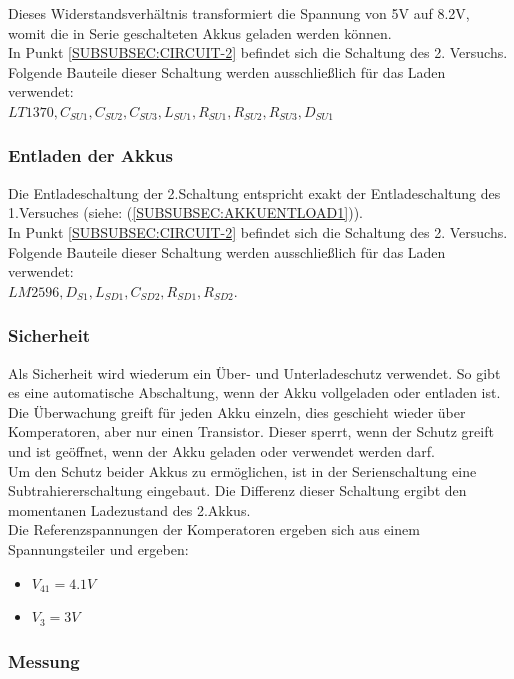 \documentclass[12pt,a4paper]{article}
\begin{document}
{\vspace{1cm}
Dieses Widerstandsverhältnis transformiert die Spannung von 5V auf 8.2V, womit die in Serie geschalteten Akkus geladen werden können.  \\
In Punkt \ref{SUBSUBSEC:CIRCUIT-2} befindet sich die Schaltung des 2. Versuchs. Folgende Bauteile dieser Schaltung werden ausschließlich für das Laden verwendet:\\ $LT1370,C_{SU1},C_{SU2},C_{SU3}, L_{SU1},R_{SU1},R_{SU2},R_{SU3},D_{SU1}$ 

\subsubsection{Entladen der Akkus}
\label{SUBSUBSEC:AKKUENTLOAD2}

Die Entladeschaltung der 2.Schaltung entspricht exakt der Entladeschaltung des 1.Versuches (siehe:  (\ref{SUBSUBSEC:AKKUENTLOAD1})).\\
In Punkt \ref{SUBSUBSEC:CIRCUIT-2} befindet sich die Schaltung des 2. Versuchs. Folgende Bauteile dieser Schaltung werden ausschließlich für das Laden verwendet:\\ $LM2596,D_{S1},L_{SD1},C_{SD2},R_{SD1},R_{SD2}$. 
\newpage

\subsubsection{Sicherheit}
\label{SUBSUBSEC:Security2}

Als Sicherheit wird wiederum ein Über- und Unterladeschutz verwendet. So gibt es eine automatische Abschaltung, wenn der Akku vollgeladen oder entladen ist. Die Überwachung greift für jeden Akku einzeln, dies geschieht wieder über Komperatoren, aber nur einen Transistor. Dieser sperrt, wenn der Schutz greift und ist geöffnet, wenn der Akku geladen oder verwendet werden darf. \\
Um den Schutz beider Akkus zu ermöglichen, ist in der Serienschaltung eine Subtrahiererschaltung eingebaut. Die Differenz dieser Schaltung ergibt den momentanen Ladezustand des 2.Akkus.\\
Die Referenzspannungen der Komperatoren ergeben sich aus einem Spannungsteiler und ergeben:
\begin{itemize}
	\item{$V_{41} = 4.1V$}
	\item{$V_3 = 3V$}
\end{itemize}
\subsubsection{Messung}
\label{SUBSUBSEC:MEASUREMENT2}

}
\end{document}
